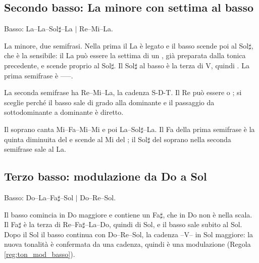 \begin{esempio}
	\label{ex:basso_svolto_1}
\end{esempio}

\subsection*{Secondo basso: La minore con settima al basso}

Basso: La--La--Sol$\sharp$--La $\mid$ Re--Mi--La.

La minore, due semifrasi. Nella prima il La è legato e il basso scende poi al Sol$\sharp$, che è la sensibile: il La può essere la settima di un , già preparata dalla tonica precedente, e scende proprio al Sol$\sharp$. Il Sol$\sharp$ al basso è la terza di V, quindi . La prima semifrase è ------.

La seconda semifrase ha Re--Mi--La, la cadenza S-D-T. Il Re può essere  o ; si sceglie  perché il basso sale di grado alla dominante e il passaggio da sottodominante a dominante è diretto.

Il soprano canta Mi--Fa--Mi--Mi e poi La--Sol$\sharp$--La. Il Fa della prima semifrase è la quinta diminuita del  e scende al Mi del ; il Sol$\sharp$ del soprano nella seconda semifrase sale al La.

\begin{esempio}
	\label{ex:basso_svolto_2}
\end{esempio}

\subsection*{Terzo basso: modulazione da Do a Sol}

Basso: Do--La--Fa$\sharp$--Sol $\mid$ Do--Re--Sol.

Il basso comincia in Do maggiore e contiene un Fa$\sharp$, che in Do non è nella scala. Il Fa$\sharp$ è la terza di Re--Fa$\sharp$--La--Do, quindi  di Sol, e il basso sale subito al Sol. Dopo il Sol il basso continua con Do--Re--Sol, la cadenza --V-- in Sol maggiore: la nuova tonalità è confermata da una cadenza, quindi è una modulazione (Regola \ref{reg:ton_mod_basso}).

